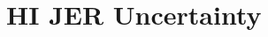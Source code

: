 \documentclass[fullpage, UKenglish]{uiucthesis2009}
\begin{document}
\mainmatter
%
%
%
%
%
%
%
%
%
%
%
\appendix
\chapter{HI JER Uncertainty}
\label{sec:appendix_hijerDerivation}

\clearpage
\end{document}
